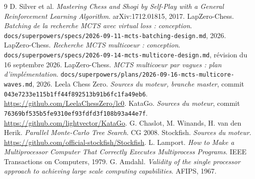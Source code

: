\documentclass[11pt,a4paper]{article}
\newcommand{\code}[1]{\texttt{\small #1}}
\begin{document}
\appendix





\begin{thebibliography}{9}
D. Silver et al. \emph{Mastering Chess and Shogi by Self-Play with a
General Reinforcement Learning Algorithm}. arXiv:1712.01815, 2017.
LapZero-Chess. \emph{Batching de la recherche MCTS avec virtual loss :
conception}. \code{docs/superpowers/specs/2026-09-11-mcts-batching-design.md},
2026.
LapZero-Chess. \emph{Recherche MCTS multicoeur : conception}.
\code{docs/superpowers/specs/2026-09-14-mcts-multicore-design.md},
r\'evision du 16 septembre 2026.
LapZero-Chess. \emph{MCTS multicoeur par vagues : plan d'impl\'ementation}.
\code{docs/superpowers/plans/2026-09-16-mcts-multicore-waves.md}, 2026.
Leela Chess Zero. \emph{Sources du moteur, branche master}, commit
\code{043e7233e115b1ff44f892513b91b6fc1fa49eb6}. \url{https://github.com/LeelaChessZero/lc0}.
KataGo. \emph{Sources du moteur}, commit
\code{76369bf535b5fe9310ef93fdfd3f108b93a44e7f}. \url{https://github.com/lightvector/KataGo}.
G. Chaslot, M. Winands, H. van den Herik. \emph{Parallel Monte-Carlo Tree
Search}. CG 2008.
Stockfish. \emph{Sources du moteur}. \url{https://github.com/official-stockfish/Stockfish}.
L. Lamport. \emph{How to Make a Multiprocessor Computer That Correctly
Executes Multiprocess Programs}. IEEE Transactions on Computers, 1979.
G. Amdahl. \emph{Validity of the single processor approach to achieving
large scale computing capabilities}. AFIPS, 1967.
\end{thebibliography}
\end{document}
